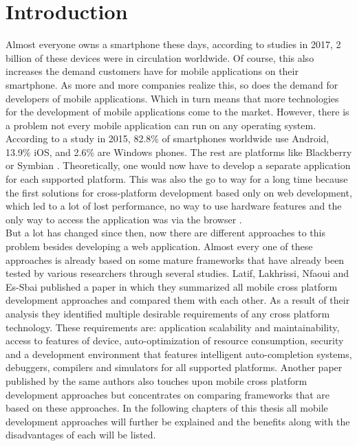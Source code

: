 \documentclass[Bachelor,BIF,english]{twbook}
\begin{document}
\chapter{Introduction}
Almost everyone owns a smartphone these days, according to studies in 2017, 2 billion of these devices were in circulation worldwide. Of course, this also increases the demand customers have for mobile applications on their smartphone. As more and more companies realize this, so does the demand for developers of mobile applications. Which in turn means that more technologies for the development of mobile applications come to the market.
However, there is a problem not every mobile application can run on any operating system. According to a study in 2015, 82.8\% of smartphones worldwide use Android, 13.9\% iOS, and 2.6\% are Windows phones. The rest are platforms like Blackberry or Symbian \cite[p.~5]{Steczko2016} \cite[p.~184]{MartinezLecomte2017}. Theoretically, one would now have to develop a separate application for each supported platform. This was also the go to way for a long time because the first solutions for cross-platform development based only on web development, which led to a lot of lost performance, no way to use hardware features and the only way to access the application was via the browser \cite[p.~626]{6420693} \cite[p.~1]{7934674}.
\\[\baselineskip]
But a lot has changed since then, now there are different approaches to this problem besides developing a web application. Almost every one of these approaches is already based on some mature frameworks that have already been tested by various researchers through several studies. Latif, Lakhrissi, Nfaoui and Es-Sbai published a paper \cite{7479278} in which they summarized all mobile cross platform development approaches and compared them with each other. As a result of their analysis they identified multiple desirable requirements of any cross platform technology. These requirements are: application scalability and maintainability, access to features of device, auto-optimization of resource consumption, security and a development environment that features intelligent auto-completion systems, debuggers, compilers and simulators for all supported platforms. Another paper \cite{7934674} published by the same authors also touches upon mobile cross platform development approaches but concentrates on comparing frameworks that are based on these approaches. In the following chapters of this thesis all mobile development approaches will further be explained and the benefits along with the disadvantages of each will be listed.
\end{document}
